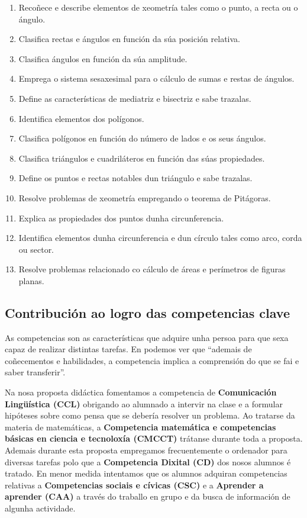 \begin{enumerate}[label=\bfseries Est\arabic*]
 \item\label{est1} Recoñece e describe elementos de xeometría tales como o punto, a recta ou o ángulo.
 \item\label{est2} Clasifica rectas e ángulos en función da súa posición relativa.
 \item\label{est3} Clasifica ángulos en función da súa amplitude.
 \item\label{est4} Emprega o sistema sesaxesimal para o cálculo de sumas e restas de ángulos.
 \item\label{est5} Define as características de mediatriz e bisectriz e sabe trazalas.
 \item\label{est6} Identifica elementos dos polígonos.
 \item\label{est7} Clasifica polígonos en función do número de lados e os seus ángulos.
 \item\label{est8} Clasifica triángulos e cuadriláteros en función das súas propiedades.
 \item\label{est9} Define os puntos e rectas notables dun triángulo e sabe trazalas.
 \item\label{est10} Resolve problemas de xeometría empregando o teorema de Pitágoras.
 \item\label{est11} Explica as propiedades dos puntos dunha circunferencia.
 \item\label{est12} Identifica elementos dunha circunferencia e dun círculo tales como arco, corda ou sector.
 \item\label{est13} Resolve problemas relacionado co cálculo de áreas e perímetros de figuras planas.
\end{enumerate}

\subsection{Contribución ao logro das competencias clave}\label{sec-comp}
As competencias son as características que adquire unha persoa para que sexa capaz de realizar distintas tarefas. En \cite[p.~3]{aprsuperior} podemos ver que ``ademais de coñecementos e habilidades, a competencia implica a comprensión do que se fai e saber transferir''.

Na nosa proposta didáctica fomentamos a competencia de \textbf{Comunicación Lingüística (CCL)} obrigando ao alumnado a intervir na clase e a formular hipóteses sobre como pensa que se debería resolver un problema. Ao tratarse da materia de matemáticas, a \textbf{Competencia matemática e competencias básicas en ciencia e tecnoloxía (CMCCT)} trátanse durante toda a proposta. Ademais durante esta proposta empregamos frecuentemente o ordenador para diversas tarefas polo que a \textbf{Competencia Dixital (CD)} dos nosos alumnos é tratado. En menor medida intentamos que os alumnos adquiran competencias relativas a \textbf{Competencias sociais e cívicas (CSC)} e a \textbf{Aprender a aprender (CAA)} a través do traballo en grupo e da busca de información de algunha actividade.


